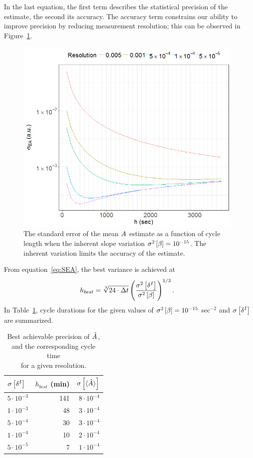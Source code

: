 \documentclass{article}
\newcommand{\Tint}{\Delta t}
\begin{document}
In the last equation, the first term describes the statistical precision of the estimate, the second its accuracy. The accuracy term constrains our ability to improve precision by reducing measurement resolution; this can be observed in Figure~\ref{fig:SEA_varb}.

\begin{figure}[h]
	\centering
	\includegraphics[scale=.8]{APrec_vs_h_for_resol}
	\caption{The standard error of the mean $\A$ estimate as a function of cycle length when the inherent slope variation $\v{\slp} = 10^{-15}$. The inherent variation limits the accuracy of the estimate.\label{fig:SEA_varb}}
\end{figure}

From equation~\eqref{eq:SEA}, the best variance is achieved at
\begin{equation}
h_{best} = \sqrt[3]{24\cdot \Tint} \bkt{\frac{\v{\delta^I}}{\v{\slp}}}^{1/3}.
\end{equation}
In Table~\ref{tbl:SEA_varb}, cycle durations for the given values of $\v{\slp} = 10^{-15}$ sec$^{-2}$ and $\SE{\delta^I}$ are summarized.
\begin{table}[h]
	\centering
	\caption{Best achievable precision of $\A*$,\\ and the corresponding cycle time\\ for a given resolution.\label{tbl:SEA_varb}}
	\begin{tabular}{lrr}
		\hline\hline
		$\SE{\delta^I}$			&	$h_{best}$ (min)	& $\SE{\avg{\A*}}$\\
		\hline
		$5\cdot10^{-3}$		&	141					& $8\cdot10^{-4}$\\
		$1\cdot10^{-3}$		&	48					& $3\cdot10^{-4}$\\
		$5\cdot10^{-4}$		&	30					& $3\cdot10^{-4}$\\
		$1\cdot10^{-4}$		&	10					& $2\cdot10^{-4}$\\
		$5\cdot10^{-5}$		&	7					& $1\cdot10^{-4}$\\
		\hline
	\end{tabular}
\end{table}

	
\end{document}
